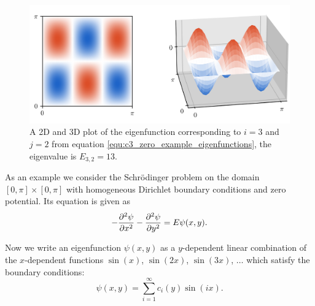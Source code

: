 \begin{figure}
  \begin{center}
    \includegraphics[width=\textwidth]{img/chapter3/example_zero_both.png}
  \end{center}
  \caption{A 2D and 3D plot of the eigenfunction corresponding to $i = 3$ and $j = 2$ from equation \eqref{equ:c3_zero_example_eigenfunctions}, the eigenvalue is $E_{3,2} = 13$.}\label{fig:example_zero}
\end{figure}

As an example we consider the Schrödinger problem on the domain $[0, \pi] \times [0, \pi]$ with homogeneous Dirichlet boundary conditions and zero potential. Its equation is given as
\begin{equation}\label{equ:c3_example_zero_potential}
  -\pdv[2]{\psi}{x} - \pdv[2]{\psi}{y} = E \psi(x, y)\text{.}
\end{equation}

Now we write an eigenfunction $\psi(x, y)$ as a $y$-dependent linear combination of the $x$-dependent functions $\sin(x)$, $\sin(2x)$, $\sin(3x)$, $\dots$ which satisfy the boundary conditions:
\begin{equation}\label{equ:c3_zero_example_sin_basis}
  \psi(x, y) = \sum_{i=1}^\infty c_i(y) \sin(ix)\text{.}
\end{equation}

